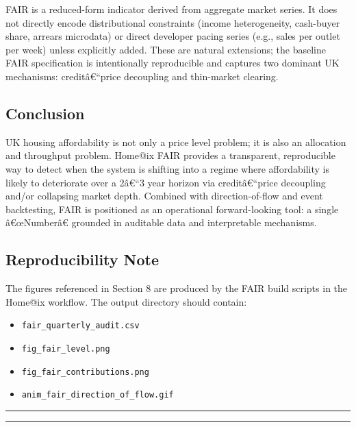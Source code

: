 FAIR is a reduced-form indicator derived from aggregate market series.
It does not directly encode distributional constraints (income
heterogeneity, cash-buyer share, arrears microdata) or direct developer
pacing series (e.g., sales per outlet per week) unless explicitly added.
These are natural extensions; the baseline FAIR specification is
intentionally reproducible and captures two dominant UK mechanisms:
creditâ€``price decoupling and thin-market clearing.

\subsection{Conclusion}\label{conclusion-1}

UK housing affordability is not only a price level problem; it is also
an allocation and throughput problem. Home@ix FAIR provides a
transparent, reproducible way to detect when the system is shifting into
a regime where affordability is likely to deteriorate over a 2â€``3 year
horizon via creditâ€``price decoupling and/or collapsing market depth.
Combined with direction-of-flow and event backtesting, FAIR is
positioned as an operational forward-looking tool: a single â€œNumberâ€
grounded in auditable data and interpretable mechanisms.

\subsection{Reproducibility Note}\label{reproducibility-note-1}

The figures referenced in Section 8 are produced by the FAIR build
scripts in the Home@ix workflow. The output directory should contain:

\begin{itemize}
\tightlist
\item
  \texttt{fair\_quarterly\_audit.csv}
\item
  \texttt{fig\_fair\_level.png}
\item
  \texttt{fig\_fair\_contributions.png}
\item
  \texttt{anim\_fair\_direction\_of\_flow.gif}
\end{itemize}

\begin{center}\rule{0.5\linewidth}{0.5pt}\end{center}

\begin{center}\rule{0.5\linewidth}{0.5pt}\end{center}
